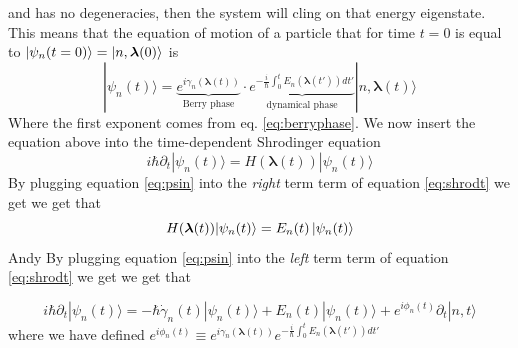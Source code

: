 \documentclass[11pt,a4paper]{report}
\theoremstyle{definition}
\theoremstyle{plain}
\theoremstyle{plain}
\begin{document}
        and has no degeneracies, then the system will cling on that energy eigenstate.\newline
		This means that the equation of motion of a particle that for time $t=0$ is equal to $\ket{\psi_n(t=0)}=\ket{n,\boldsymbol \lambda(0)}$ is 
		\begin{equation}
			\label{eq:psin}
			|\psi_n(t)\rangle=\underbrace{e^{i\gamma_n(\boldsymbol \lambda (t))}}_{\textrm{Berry phase}}\cdot
            \underbrace{e^{-\frac i\hbar\int_0^t E_n(\boldsymbol \lambda (t')) dt'}}_\textrm{dynamical phase}|n,\boldsymbol \lambda (t)\rangle      
		\end{equation}
		Where the first exponent comes from eq. \ref{eq:berryphase}. We now insert the equation above into the time-dependent Shrodinger equation
		\begin{equation}
			\label{eq:shrodt}
			i\hbar\partial_t|\psi_n(t)\rangle=H(\boldsymbol \lambda(t)) |\psi_n(t)\rangle
		\end{equation}
		By plugging equation \ref{eq:psin} into the \textit{right} term term of equation \ref{eq:shrodt} we get we get that
		\begin{equation}
			\label{eq:H(t)}
			H(\boldsymbol \lambda(t)) |\psi_n(t)\rangle = E_n(t)\ket{\psi_n(t)}
		\end{equation}
		Andy By plugging equation \ref{eq:psin} into the \textit{left} term term of equation \ref{eq:shrodt} we get we get that

		\begin{equation}
			\label{eq:psin-t}
			i\hbar\partial_t|\psi_n(t)\rangle=
            -\hbar \dot \gamma_n(t)|\psi_n(t)\rangle + E_n(t)|\psi_n(t)\rangle + e^{i\phi_n(t)}\partial_t|n,t\rangle
		\end{equation}
		where we have defined $e^{i\phi_n(t)} \equiv e^{i\gamma_n(\boldsymbol \lambda (t))}e^{-\frac i\hbar\int_0^t E_n(\boldsymbol \lambda (t')) dt'}$
\end{document}
